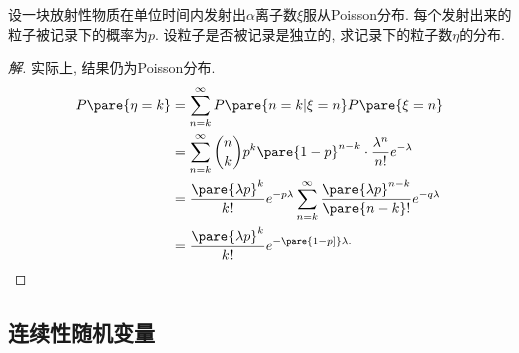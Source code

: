 \documentclass{ctexart}
\begin{document}
\begin{sample}
    \begin{ex}
        设一块放射性物质在单位时间内发射出$\alpha$离子数$\xi$服从Poisson分布. 每个发射出来的粒子被记录下的概率为$p$. 设粒子是否被记录是独立的, 求记录下的粒子数$\eta$的分布.
    \end{ex}
    \begin{proof}[解]
        实际上, 结果仍为Poisson分布.
        \begin{align*}
            P\pare{\eta = k} &= \sum_{n=k}^\infty P\pare{n=k\vert \xi = n}P\pare{\xi = n} \\
            &= \sum_{n=k}^\infty \binom{n}{k} p^k \pare{1-p}^{n-k} \cdot \frac{\lambda^n}{n!}e^{-\lambda} \\
            &= \frac{\pare{\lambda p}^k}{k!}e^{-p\lambda} \sum_{n=k}^\infty \frac{\pare{\lambda p}^{n-k}}{\pare{n-k}!}e^{-q\lambda} \\
            &= \frac{\pare{\lambda p}^k}{k!}e^{-\pare{1-p]}\lambda.}
        \end{align*}
    \end{proof}
\end{sample}



\subsection{连续性随机变量} %
\label{sub:连续性随机变量}
\end{document}
